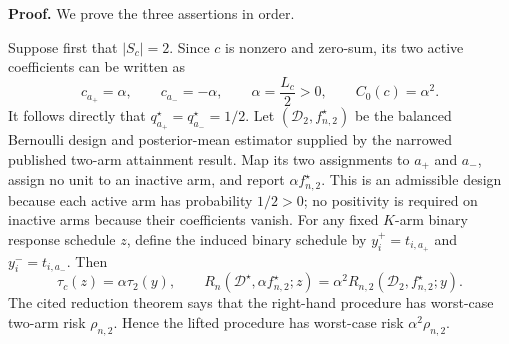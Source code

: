 \textbf{Proof.}
We prove the three assertions in order.

Suppose first that \(|S_c|=2\). Since \(c\) is nonzero and zero-sum, its two active coefficients can be written as
\[
 c_{a_+}=\alpha,
 \qquad c_{a_-}=-\alpha,
 \qquad
 \alpha=\frac{L_c}{2}>0,
 \qquad
 C_0(c)=\alpha^2.
\]
It follows directly that \(q_{a_+}^\star=q_{a_-}^\star=1/2\). Let \((\mathcal D_2,f_{n,2}^\star)\) be the balanced Bernoulli design and posterior-mean estimator supplied by the narrowed published two-arm attainment result. Map its two assignments to \(a_+\) and \(a_-\), assign no unit to an inactive arm, and report \(\alpha f_{n,2}^\star\). This is an admissible design because each active arm has probability \(1/2>0\); no positivity is required on inactive arms because their coefficients vanish. For any fixed \(K\)-arm binary response schedule \(z\), define the induced binary schedule by \(y_i^+=t_{i,a_+}\) and \(y_i^-=t_{i,a_-}\). Then
\[
 \tau_c(z)=\alpha\tau_2(y),
 \qquad
 R_n(\mathcal D^\star,\alpha f_{n,2}^\star;z)
 =\alpha^2R_{n,2}(\mathcal D_2,f_{n,2}^\star;y).
\]
The cited reduction theorem says that the right-hand procedure has worst-case two-arm risk \(\rho_{n,2}\). Hence the lifted procedure has worst-case risk \(\alpha^2\rho_{n,2}\).

